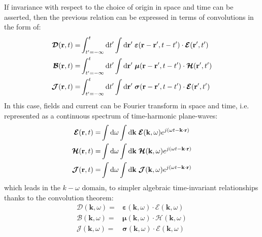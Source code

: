 If invariance with respect to the choice of origin in space and time can be asserted, then the previous relation can be expressed in terms of convolutions in the form of\parencite[p.19]{Brambilla1998}:
\begin{subequations}
	\begin{align}
	\boldsymbol{\mathcal{D}}(\mathbf{r}, t) 
	= &
	\int_{t'=-\infty}^t \mathop{}\!\mathrm{d} t'
	\int \mathop{}\!\mathrm{d} \mathbf{r}' \;
	\boldsymbol{\varepsilon}(\mathbf{r}-\mathbf{r}', t-t') \cdot \boldsymbol{\mathcal{E}}(\mathbf{r}', t') 
	\\
	\boldsymbol{\mathcal{B}}(\mathbf{r}, t)
	=& 
	\int_{t'=-\infty}^t \mathop{}\!\mathrm{d} t'
	\int \mathop{}\!\mathrm{d} \mathbf{r}' \;
	\boldsymbol{\mu}(\mathbf{r}-\mathbf{r}', t-t') \cdot \boldsymbol{\mathcal{H}}(\mathbf{r}', t')  
	\\
	\boldsymbol{\mathcal{J}}(\mathbf{r}, t)
	=& 
	\int_{t'=-\infty}^t \mathop{}\!\mathrm{d} t'
	\int \mathop{}\!\mathrm{d} \mathbf{r}' \;
	\boldsymbol{\sigma}(\mathbf{r}-\mathbf{r}', t-t') \cdot \boldsymbol{\mathcal{E}}(\mathbf{r}', t')  
	\end{align}
\end{subequations}
In this case, fields and current can be Fourier transform in space and time, i.e. represented as a continuous spectrum of time-harmonic plane-waves\parencite{Clemmow1996, Jackson1998}:
\begin{subequations}
	\begin{align}
	\boldsymbol{\mathcal{E}}(\mathbf{r}, t) =& \int \mathop{}\!\mathrm{d} \omega \int \mathop{}\!\mathrm{d} \mathbf{k} \;
	\boldsymbol{\mathcal{E}}(\mathbf{k}, \omega) e^{j(\omega t - \mathbf{k}\cdot\mathbf{r})}
	\\
	\boldsymbol{\mathcal{H}}(\mathbf{r}, t) =& \int \mathop{}\!\mathrm{d} \omega \int \mathop{}\!\mathrm{d} \mathbf{k} \;
	\boldsymbol{\mathcal{H}}(\mathbf{k}, \omega) e^{j(\omega t - \mathbf{k}\cdot\mathbf{r})}
	\\
	\boldsymbol{\mathcal{J}}(\mathbf{r}, t) =& \int \mathop{}\!\mathrm{d} \omega \int \mathop{}\!\mathrm{d} \mathbf{k} \;
	\boldsymbol{\mathcal{J}}(\mathbf{k}, \omega) e^{j(\omega t - \mathbf{k}\cdot\mathbf{r})}
	\end{align}
\end{subequations}
which leads in the $k-\omega$ domain, to simpler algebraic time-invariant relationships thanks to the convolution theorem:
\begin{subequations}
	\begin{align}
	\boldsymbol{\mathcal{D}}(\mathbf{k}, \omega) 
	=& 
	\boldsymbol{\varepsilon}(\mathbf{k}, \omega) \cdot \boldsymbol{\mathcal{E}}(\mathbf{k}, \omega) 
	\\
	\boldsymbol{\mathcal{B}}(\mathbf{k}, \omega) 
	=& 
	\boldsymbol{\mu}(\mathbf{k}, \omega) \cdot \boldsymbol{\mathcal{H}}(\mathbf{k}, \omega) 
	\\
	\boldsymbol{\mathcal{J}}(\mathbf{k}, \omega) 
	=& 
	\boldsymbol{\sigma}(\mathbf{k}, \omega) \cdot \boldsymbol{\mathcal{E}}(\mathbf{k}, \omega) 
	\end{align}
\end{subequations}
